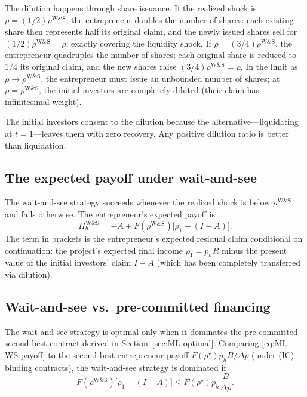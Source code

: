 \documentclass[11pt,a4paper,oneside]{book}
\def\leq{\leqslant}
\theoremstyle{plain}
\theoremstyle{definition}
\theoremstyle{remark}
\numberwithin{equation}{chapter}
\begin{document}
The dilution happens through share issuance.
If the realized shock is $\rho = (1/2) \rho^{\text{W\&S}}$, the entrepreneur doubles the number of shares: each existing share then represents half its original claim, and the newly issued shares sell for $(1/2) \rho^{\text{W\&S}} = \rho$, exactly covering the liquidity shock.
If $\rho = (3/4) \rho^{\text{W\&S}}$, the entrepreneur quadruples the number of shares; each original share is reduced to $1/4$ its original claim, and the new shares raise $(3/4) \rho^{\text{W\&S}} = \rho$.
In the limit as $\rho \to \rho^{\text{W\&S}}$, the entrepreneur must issue an unbounded number of shares; at $\rho = \rho^{\text{W\&S}}$, the initial investors are completely diluted (their claim has infinitesimal weight).

The initial investors consent to the dilution because the alternative---liquidating at $t=1$---leaves them with zero recovery.
Any positive dilution ratio is better than liquidation.

\subsection{The expected payoff under wait-and-see}

The wait-and-see strategy succeeds whenever the realized shock is below $\rho^{\text{W\&S}}$, and fails otherwise.
The entrepreneur's expected payoff is
\begin{equation}\label{eq:ML-WS-payoff}
  \Pi_b^{\text{W\&S}} = -A + F(\rho^{\text{W\&S}}) \bigl[ \rho_1 - (I - A) \bigr].
\end{equation}
The term in brackets is the entrepreneur's expected residual claim conditional on continuation: the project's expected final income $\rho_1 = p_h R$ minus the present value of the initial investors' claim $I - A$ (which has been completely transferred via dilution).

\subsection{Wait-and-see vs.\ pre-committed financing}

The wait-and-see strategy is optimal only when it dominates the pre-committed second-best contract derived in Section~\ref{sec:ML-optimal}.
Comparing \eqref{eq:ML-WS-payoff} to the second-best entrepreneur payoff $F(\rho^\star) p_h B/\Delta p$ (under (IC)-binding contracts), the wait-and-see strategy is dominated if
\begin{equation}\label{eq:ML-WS-dominated}
  F(\rho^{\text{W\&S}}) \bigl[ \rho_1 - (I - A) \bigr] \leq F(\rho^\star) p_h \frac{B}{\Delta p}.
\end{equation}
\end{document}
